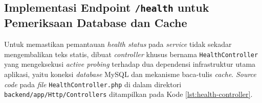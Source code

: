 \documentclass[a4paper,oneside,11pt]{book}
\begin{document}
\subsection{Implementasi Endpoint \texttt{/health} untuk Pemeriksaan Database dan Cache}

\par Untuk memastikan pemantauan \textit{health status} pada \textit{service} tidak sekadar mengembalikan teks statis, dibuat \textit{controller} khusus bernama \texttt{HealthController} yang mengeksekusi \textit{active probing} terhadap dua dependensi infrastruktur utama aplikasi, yaitu koneksi \textit{database} MySQL dan mekanisme baca-tulis \textit{cache}. \textit{Source code} pada \textit{file} \texttt{HealthController.php} di dalam direktori \texttt{backend/app/Http/Controllers} ditampilkan pada Kode \ref{lst:health-controller}.
\end{document}
